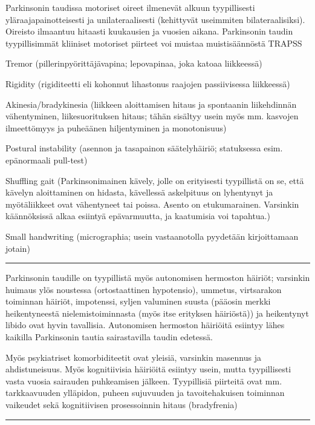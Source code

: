 \documentclass[
]{book}
\begin{document}
Parkinsonin taudissa motoriset oireet ilmenevät alkuun tyypillisesti yläraajapainotteisesti ja unilateraalisesti (kehittyvät useimmiten bilateraalisiksi). Oireisto ilmaantuu hitaasti kuukausien ja vuosien aikana. Parkinsonin taudin tyypillisimmät kliiniset motoriset piirteet voi muistaa muistisäännöstä TRAPSS

Tremor (pillerinpyörittäjävapina; lepovapinaa, joka katoaa liikkeessä)

Rigidity (rigiditeetti eli kohonnut lihastonus raajojen passiivisessa liikkeessä)

Akinesia/bradykinesia (liikkeen aloittamisen hitaus ja spontaanin liikehdinnän vähentyminen, liikesuorituksen hitaus; tähän sisältyy usein myös mm. kasvojen ilmeettömyys ja puheäänen hiljentyminen ja monotonisuus)

Postural instability (asennon ja tasapainon säätelyhäiriö; statuksessa esim. epänormaali pull-test)

Shuffling gait (Parkinsonimainen kävely, jolle on erityisesti tyypillistä on se, että kävelyn aloittaminen on hidasta, kävellessä askelpituus on lyhentynyt ja myötäliikkeet ovat vähentyneet tai poissa. Asento on etukumarainen. Varsinkin käännöksissä alkaa esiintyä epävarmuutta, ja kaatumisia voi tapahtua.)

Small handwriting (micrographia; usein vastaanotolla pyydetään kirjoittamaan jotain)

\begin{center}\rule{0.5\linewidth}{0.5pt}\end{center}

Parkinsonin taudille on tyypillistä myös autonomisen hermoston häiriöt; varsinkin huimaus ylös noustessa (ortostaattinen hypotensio), ummetus, virtsarakon toiminnan häiriöt, impotenssi, syljen valuminen suusta (pääosin merkki heikentyneestä nielemistoiminnasta (myös itse erityksen häiriöstä)) ja heikentynyt libido ovat hyvin tavallisia. Autonomisen hermoston häiriöitä esiintyy lähes kaikilla Parkinsonin tautia sairastavilla taudin edetessä.

Myös psykiatriset komorbiditeetit ovat yleisiä, varsinkin masennus ja ahdistuneisuus. Myös kognitiivisia häiriöitä esiintyy usein, mutta tyypillisesti vasta vuosia sairauden puhkeamisen jälkeen. Tyypillisiä piirteitä ovat mm. tarkkaavuuden ylläpidon, puheen sujuvuuden ja tavoitehakuisen toiminnan vaikeudet sekä kognitiivisen prosessoinnin hitaus (bradyfrenia)

\begin{center}\rule{0.5\linewidth}{0.5pt}\end{center}
\end{document}

